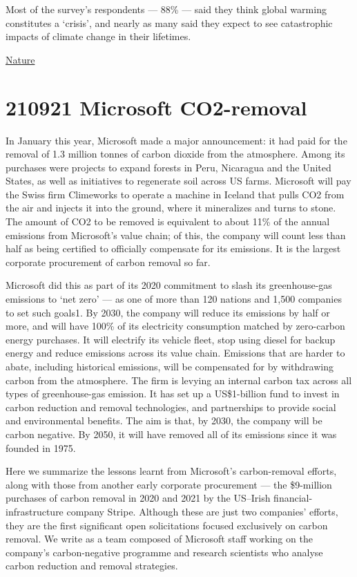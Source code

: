 \documentclass[
]{book}
\begin{document}
Most of the survey's respondents --- 88\% --- said they think global warming constitutes a `crisis', and nearly as many said they expect to see catastrophic impacts of climate change in their lifetimes.

\href{https://www.nature.com/articles/d41586-021-02990-w}{Nature}

\hypertarget{microsoft-co2-removal}{%
\section{210921 Microsoft CO2-removal}\label{microsoft-co2-removal}}

In January this year, Microsoft made a major announcement: it had paid for the removal of 1.3 million tonnes of carbon dioxide from the atmosphere. Among its purchases were projects to expand forests in Peru, Nicaragua and the United States, as well as initiatives to regenerate soil across US farms. Microsoft will pay the Swiss firm Climeworks to operate a machine in Iceland that pulls CO2 from the air and injects it into the ground, where it mineralizes and turns to stone. The amount of CO2 to be removed is equivalent to about 11\% of the annual emissions from Microsoft's value chain; of this, the company will count less than half as being certified to officially compensate for its emissions. It is the largest corporate procurement of carbon removal so far.

Microsoft did this as part of its 2020 commitment to slash its greenhouse-gas emissions to `net zero' --- as one of more than 120 nations and 1,500 companies to set such goals1. By 2030, the company will reduce its emissions by half or more, and will have 100\% of its electricity consumption matched by zero-carbon energy purchases. It will electrify its vehicle fleet, stop using diesel for backup energy and reduce emissions across its value chain. Emissions that are harder to abate, including historical emissions, will be compensated for by withdrawing carbon from the atmosphere. The firm is levying an internal carbon tax across all types of greenhouse-gas emission. It has set up a US\$1-billion fund to invest in carbon reduction and removal technologies, and partnerships to provide social and environmental benefits. The aim is that, by 2030, the company will be carbon negative. By 2050, it will have removed all of its emissions since it was founded in 1975.

Here we summarize the lessons learnt from Microsoft's carbon-removal efforts, along with those from another early corporate procurement --- the \$9-million purchases of carbon removal in 2020 and 2021 by the US--Irish financial-infrastructure company Stripe. Although these are just two companies' efforts, they are the first significant open solicitations focused exclusively on carbon removal. We write as a team composed of Microsoft staff working on the company's carbon-negative programme and research scientists who analyse carbon reduction and removal strategies.
\end{document}

